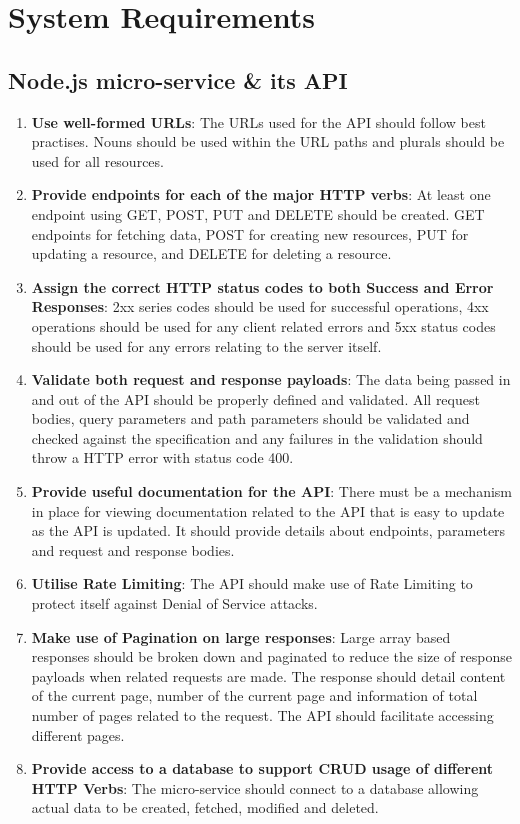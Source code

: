 \section{System Requirements}
\subsection{Node.js micro-service \& its API}
\begin{enumerate}
    \item \textbf{Use well-formed URLs}: The URLs used for the API should follow best practises. Nouns should be used within the URL paths and plurals should be used for all resources. 
    \item \textbf{Provide endpoints for each of the major HTTP verbs}: At least one endpoint using GET, POST, PUT and DELETE should be created. GET endpoints for fetching data, POST for creating new resources, PUT for updating a resource, and DELETE for deleting a resource. 
    \item \textbf{Assign the correct HTTP status codes to both Success and Error Responses}: 2xx series codes should be used for successful operations, 4xx operations should be used for any client related errors and 5xx status codes should be used for any errors relating to the server itself.
    \item \textbf{Validate both request and response payloads}: The data being passed in and out of the API should be properly defined and validated. All request bodies, query parameters and path parameters should be validated and checked against the specification and any failures in the validation should throw a HTTP error with status code 400.
    \item \textbf{Provide useful documentation for the API}: There must be a mechanism in place for viewing documentation related to the API that is easy to update as the API is updated. It should provide details about endpoints, parameters and request and response bodies. 
    \item \textbf{Utilise Rate Limiting}: The API should make use of Rate Limiting to protect itself against Denial of Service attacks.
    \item \textbf{Make use of Pagination on large responses}: Large array based responses should be broken down and paginated to reduce the size of response payloads when related requests are made. The response should detail content of the current page, number of the current page and information of total number of pages related to the request. The API should facilitate accessing different pages.
    \item \textbf{Provide access to a database to support CRUD usage of different HTTP Verbs}:  The micro-service should connect to a database allowing actual data to be created, fetched, modified and deleted.
\end{enumerate}

